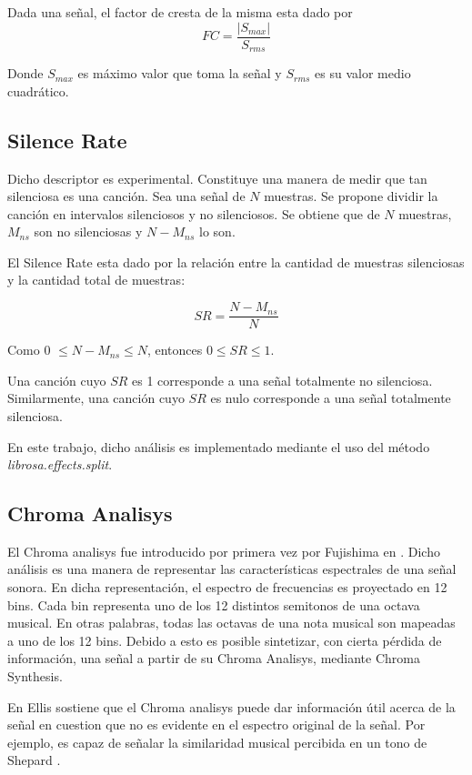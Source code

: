 \documentclass[]{article}
\begin{document}
\begin{multicols}{2}
Dada una señal, el factor de cresta de la misma esta dado por
\begin{equation*}
  FC=\frac{\left|S_{max}\right|}{S_{rms}}
\end{equation*}

Donde $S_{max}$ es máximo valor que toma la señal y $S_{rms}$ es su valor medio
cuadrático.


\subsection{Silence Rate}
Dicho descriptor es experimental. Constituye una manera de medir que tan
silenciosa es una canción. Sea una señal de $N$ muestras. Se propone dividir la
canción en intervalos silenciosos y no silenciosos. Se obtiene que de $N$ muestras,
$M_{ns}$ son no silenciosas y $N-M_{ns}$ lo son.

El Silence Rate esta dado por la relación entre la cantidad de muestras
silenciosas y la cantidad total de muestras:

\begin{equation*}
  SR=\frac{N-M_{ns}}{N}
\end{equation*}
\vspace{0.3 cm}

Como  0 $\leq N-M_{ns}\leq N$, entonces $0 \leq SR \leq 1$.

Una canción cuyo $SR$ es 1 corresponde a una señal totalmente no silenciosa.
Similarmente, una canción cuyo $SR$ es nulo corresponde a una señal totalmente
silenciosa.

En este trabajo, dicho análisis es implementado mediante el uso del método
\emph{{librosa.effects.split}}.

\subsection{Chroma Analisys}
\label{Sec:Chroma}
El Chroma analisys fue introducido por primera vez por Fujishima en \cite{fujishima1999realtime}.
Dicho análisis es una manera de representar las características espectrales
de una señal sonora. En dicha representación, el espectro de frecuencias es
proyectado en 12 bins. Cada bin representa uno de los 12 distintos semitonos
de una octava musical. En otras palabras, todas las octavas de una nota musical
son mapeadas a uno de los 12 bins. Debido a esto es posible sintetizar, con cierta
pérdida de información, una señal a partir de su Chroma Analisys, mediante Chroma
Synthesis.

En \cite{Ellis} Ellis sostiene que el Chroma analisys puede dar información
útil acerca de la señal en cuestion que no es evidente en el espectro original de
la señal. Por ejemplo, es capaz de señalar la similaridad musical percibida en
un tono de Shepard \cite{bello}.


\end{multicols}
\end{document}
